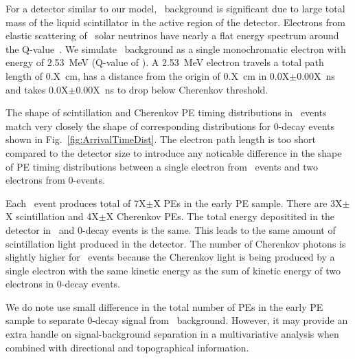 For a detector similar to our model, \B~background is significant due to large total mass of the liquid scintillator in
the active region of the detector.
Electrons from elastic scattering of \B~solar neutrinos have nearly a flat energy spectrum around the 
Q-value~\cite{SNOp-B8-bkg}. We simulate \B~background as a single monochromatic electron with energy of 2.53~MeV 
(Q-value of \Te). A 2.53~MeV electron travels a total path length of 0.X~cm, has a distance from the origin of 0.X~cm in 
0.0X$\pm$0.00X~ns  and takes 0.0X$\pm$0.00X~ns to drop below Cherenkov threshold.

The shape of scintillation and Cherenkov PE timing distributions in \B~events match very closely the shape of corresponding distributions
for 0\nbb-decay events shown in Fig.~\ref{fig:ArrivalTimeDist}. The electron path length is too short compared to the detector size to 
introduce any noticable difference in the shape of PE timing distributions between a single electron from \B~events and two 
electrons from 0\nbb-events.

Each \B~event produces total of 7X$\pm$X PEs in the early PE sample. There are 3X$\pm$X scintillation and 4X$\pm$X Cherenkov PEs.
The total energy depositited in the detector in \B~and 0\nbb-decay events is the same. This leads to the same amount of 
scintillation light produced in the detector. The number of Cherenkov photons is slightly higher for \B~events because the Cherenkov 
light is being produced by a single electron with the same kinetic energy as the sum of kinetic energy of two electrons 
in 0\nbb-decay events. 

We do note use small difference in the total number of PEs in the early PE sample to separate 0\nbb-decay signal from \B~background.
However, it may provide an extra handle on signal-background separation in a multivariative analysis when combined with directional
and topographical information.

